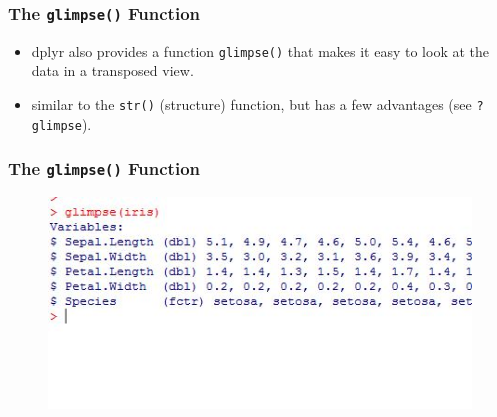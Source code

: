 \documentclass{beamer}
\begin{document}
			\begin{frame}[fragile]
				
				\frametitle{The \texttt{glimpse()} Function} 
				\Large
				\vspace{-1cm}
				\begin{itemize}
					\item dplyr also provides a function \texttt{glimpse()} that makes it easy to look at the data in a transposed view. 
					
					\item similar to the \texttt{str()} (structure) function, but has a few advantages (see \texttt{?glimpse}).
					
				\end{itemize}
			\end{frame}
			\begin{frame}[fragile]
				
				\frametitle{The \texttt{glimpse()} Function }
				\begin{figure}
					\centering
					\includegraphics[width=1.2\linewidth]{images/irisglimpse}
					
				\end{figure}
				
			\end{frame}
\end{document}
